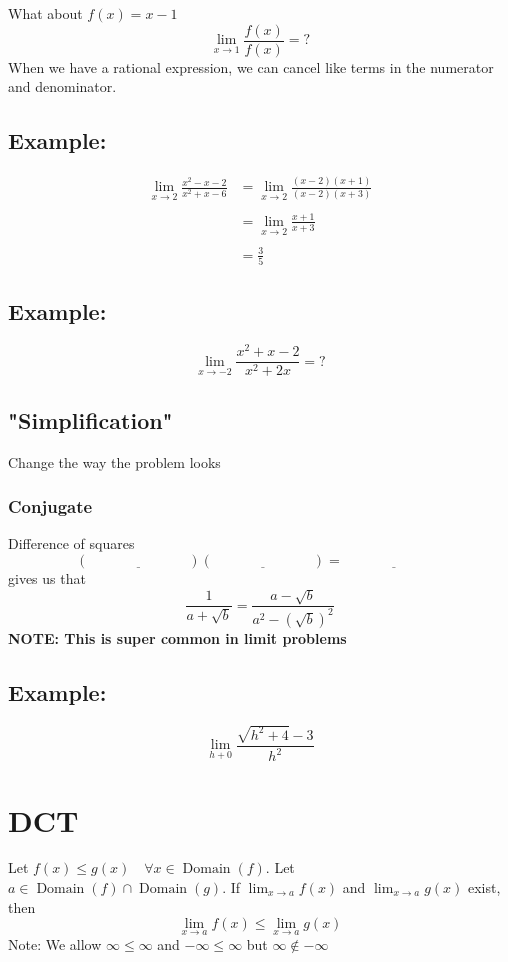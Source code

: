 \documentclass[20pt]{extarticle}
\newcommand{\LP}{\left(}
\newcommand{\RP}{\right)}
\begin{document}
What about \(f(x)=x-1\)
\[\lim_{x\to 1} \frac{f(x)}{f(x)}=?\]
\vskip 5cm
When we have a rational expression, we can cancel like terms in the
numerator and denominator.
\newpage
\subsection*{\textbf{\color{draculared}Example:}}
\begin{align*}
   \lim _{x \rightarrow 2} \frac{x^2-x-2}{x^2+x-6}
  & =\lim _{x \rightarrow 2} \frac{(x-2)(x+1)}{(x-2)(x+3)} \\
  & \\
  & =\lim _{x \rightarrow 2} \frac{x+1}{x+3}\\
  & \\
  &=\frac{3}{5}
\end{align*}
\subsection*{\textbf{\color{draculared}Example:}}
\[\lim _{x \rightarrow-2} \frac{x^2+x-2}{x^2+2 x}=?\]
\newpage
\subsection*{\textbf{\color{draculaorange}"Simplification"}}
Change the way the problem looks
\subsubsection*{\textbf{\color{draculaorange}Conjugate}}
Difference of squares
\[\LP \underline{\hspace{3cm}}\RP\LP \underline{\hspace{3cm}}\RP=\underline{\hspace{3cm}}\]
gives us that
\[\frac{1}{a+\sqrt{b}}=\frac{a-\sqrt{b}}{a^2-\LP\sqrt{b}\RP^2}\]
\textbf{\color{draculapurple}NOTE: This is super common in limit problems}
\newpage
\subsection*{\textbf{\color{draculared}Example:}}
\[\lim _{h+0} \frac{\sqrt{h^2+4}-3}{h^2}\]
\newpage
\section*{\textbf{\color{draculaorange}DCT}}
Let $f(x) \leq g(x) \quad \forall x \in \operatorname{Domain}(f)$.
Let $a \in\operatorname{Domain}(f) \cap\operatorname{Domain}(g)$.
If $\lim _{x \rightarrow a} f(x)$ and $\lim _{x \rightarrow a} g(x)$ exist, then
$$\lim _{x \rightarrow a} f(x) \leq \lim _{x \rightarrow a} g(x)$$
Note: We allow $\infty \leq \infty$ and
$-\infty \leq \infty$ but $\infty \notin-\infty$
\newpage
\end{document}
